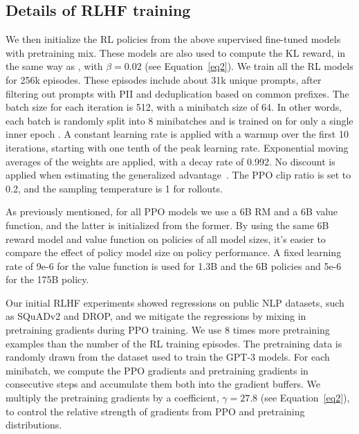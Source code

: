 \subsection{Details of RLHF training}
We then initialize the RL policies from the above supervised fine-tuned models with pretraining mix. These models are also used to compute the KL reward, in the same way as \citet{stiennon2020learning}, with $\beta=0.02$ (see Equation~\ref{eq2}). We train all the RL models for 256k episodes. These episodes include about 31k unique prompts, after filtering out prompts with PII and deduplication based on common prefixes.
The batch size for each iteration is 512, with a minibatch size of 64. In other words, each batch is randomly split into 8 minibatches and is trained on for only a single inner epoch \citep{schulman2017proximal}. A constant learning rate is applied with a warmup over the first 10 iterations, starting with one tenth of the peak learning rate. Exponential moving averages of the weights are applied, with a decay rate of 0.992. No discount is applied when estimating the generalized advantage~\citep{schulman2016gae}. The PPO clip ratio is set to 0.2, and the sampling temperature is 1 for rollouts.

As previously mentioned, for all PPO models we use a 6B RM and a 6B value function, and the latter is initialized from the former. 
By using the same 6B reward model and value function on policies of all model sizes, it's easier to compare the effect of policy model size on policy performance. A fixed learning rate of 9e-6 for the value function is used for 1.3B and the 6B policies and 5e-6 for the 175B policy. 


Our initial RLHF experiments showed regressions on public NLP datasets,  such as SQuADv2 and DROP, and we mitigate the regressions by mixing in pretraining gradients during PPO training. We use 8 times more pretraining examples than the number of the RL training episodes. The pretraining data is randomly drawn from the dataset used to train the GPT-3 models. For each minibatch, we compute the PPO gradients and pretraining gradients in consecutive steps and accumulate them both into the gradient buffers. We multiply the pretraining gradients by a coefficient, $\gamma=27.8$ (see Equation~\ref{eq2}), to control the relative strength of gradients from PPO and pretraining distributions.


